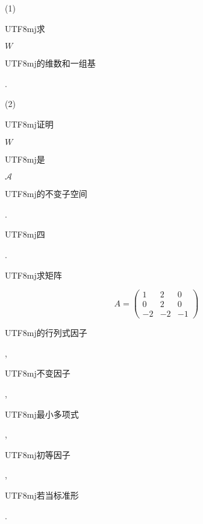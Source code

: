 \documentclass[10pt]{article}
\begin{document}
(1) \begin{CJK}{UTF8}{mj}求\end{CJK} $W$ \begin{CJK}{UTF8}{mj}的维数和一组基\end{CJK}.

(2) \begin{CJK}{UTF8}{mj}证明\end{CJK} $W$ \begin{CJK}{UTF8}{mj}是\end{CJK} $\mathscr{A}$ \begin{CJK}{UTF8}{mj}的不变子空间\end{CJK}.

\begin{CJK}{UTF8}{mj}四\end{CJK}. \begin{CJK}{UTF8}{mj}求矩阵\end{CJK}
$$
A=\left(\begin{array}{ccc}
1 & 2 & 0 \\
0 & 2 & 0 \\
-2 & -2 & -1
\end{array}\right)
$$
\begin{CJK}{UTF8}{mj}的行列式因子\end{CJK}, \begin{CJK}{UTF8}{mj}不变因子\end{CJK}, \begin{CJK}{UTF8}{mj}最小多项式\end{CJK}, \begin{CJK}{UTF8}{mj}初等因子\end{CJK}, \begin{CJK}{UTF8}{mj}若当标准形\end{CJK}.
\end{document}
